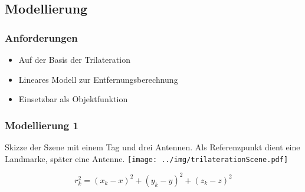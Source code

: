 \subsection{Modellierung}
\begin{frame}
  \frametitle{Anforderungen}
%
\begin{itemize} 
  \item Auf der Basis der Trilateration
  \pause 
  \item Lineares Modell zur Entfernungsberechnung
  \pause 
  \item Einsetzbar als Objektfunktion
\end{itemize} 
	
%
\end{frame}
\begin{frame}
  \frametitle{Modellierung  1}
%
  \begin{center}
	\tiny Skizze der Szene mit einem Tag und drei Antennen. Als Referenzpunkt dient eine Landmarke, später eine Antenne.
%
  	\texttt{[image: ../img/trilaterationScene.pdf]}
  \end{center}
\[
r_k^2= (x_k-x )^2 + (y_k-y )^2 + (z_k-z )^2
\]
\end{frame}

